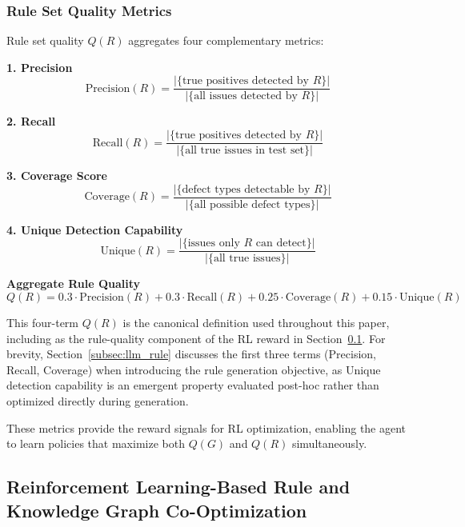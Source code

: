 \documentclass[runningheads]{llncs}
\begin{document}
\subsubsection{Rule Set Quality Metrics}

Rule set quality $Q(R)$ aggregates four complementary metrics:

\textbf{1. Precision}
\begin{equation}
\text{Precision}(R) = \frac{|\{\text{true positives detected by } R\}|}{|\{\text{all issues detected by } R\}|}
\end{equation}

\textbf{2. Recall}
\begin{equation}
\text{Recall}(R) = \frac{|\{\text{true positives detected by } R\}|}{|\{\text{all true issues in test set}\}|}
\end{equation}

\textbf{3. Coverage Score}
\begin{equation}
\text{Coverage}(R) = \frac{|\{\text{defect types detectable by } R\}|}{|\{\text{all possible defect types}\}|}
\end{equation}

\textbf{4. Unique Detection Capability}
\begin{equation}
\text{Unique}(R) = \frac{|\{\text{issues only } R \text{ can detect}\}|}{|\{\text{all true issues}\}|}
\end{equation}

\textbf{Aggregate Rule Quality}
\begin{equation}
\label{eq:qr_full}
Q(R) = 0.3 \cdot \text{Precision}(R) + 0.3 \cdot \text{Recall}(R) + 0.25 \cdot \text{Coverage}(R) + 0.15 \cdot \text{Unique}(R)
\end{equation}

This four-term $Q(R)$ is the canonical definition used throughout this paper, including as the rule-quality component of the RL reward in Section~\ref{subsec:rl_co_optimization}. For brevity, Section~\ref{subsec:llm_rule} discusses the first three terms (Precision, Recall, Coverage) when introducing the rule generation objective, as Unique detection capability is an emergent property evaluated post-hoc rather than optimized directly during generation.

These metrics provide the reward signals for RL optimization, enabling the agent to learn policies that maximize both $Q(G)$ and $Q(R)$ simultaneously.

\subsection{Reinforcement Learning-Based Rule and Knowledge Graph Co-Optimization}
\label{subsec:rl_co_optimization}
\end{document}
